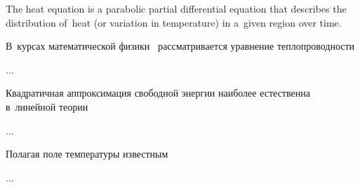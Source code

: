 \begin{otherlanguage}{russian}

{\small
The heat equation is a parabolic partial differential equation that describes the distribution of~heat (or variation in temperature) in a~given region over time.
\par}

В~курсах математической физики~\cite{tihonovsamarsky-mathphysicsequations} рассматривается уравнение теплопроводности

...



\end{otherlanguage}



\begin{otherlanguage}{russian}

Квадратичная аппроксимация свободной энергии наиболее естественна в~линейной теории

...



\end{otherlanguage}



\begin{otherlanguage}{russian}

Полагая поле температуры известным

...



\end{otherlanguage}


